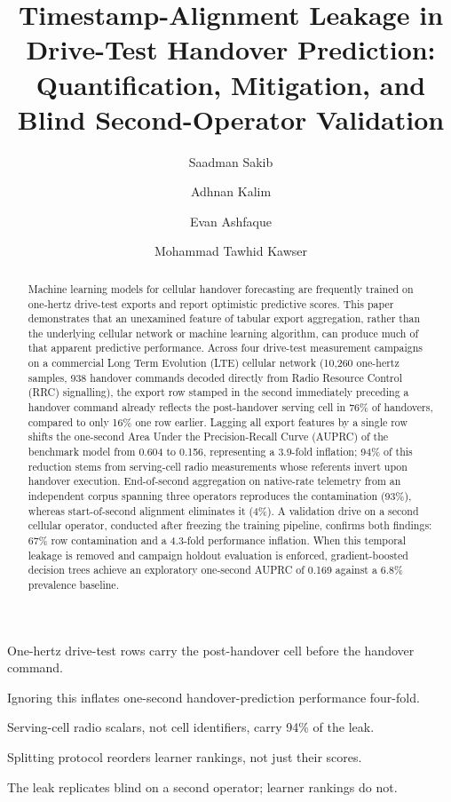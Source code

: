 \documentclass[5p,times,twocolumn]{elsarticle}
\begin{document}
\begin{frontmatter}

\title{Timestamp-Alignment Leakage in Drive-Test Handover Prediction: Quantification, Mitigation, and Blind Second-Operator Validation}

\author[iut]{Saadman Sakib}
\author[iut]{Adhnan Kalim}
\author[iut]{Evan Ashfaque}
\author[iut]{Mohammad Tawhid Kawser}

\begin{abstract}
Machine learning models for cellular handover forecasting are frequently trained on one-hertz drive-test exports and report optimistic predictive scores. This paper demonstrates that an unexamined feature of tabular export aggregation, rather than the underlying cellular network or machine learning algorithm, can produce much of that apparent predictive performance. Across four drive-test measurement campaigns on a commercial Long Term Evolution (LTE) cellular network (10,260 one-hertz samples, 938 handover commands decoded directly from Radio Resource Control (RRC) signalling), the export row stamped in the second immediately preceding a handover command already reflects the post-handover serving cell in 76\% of handovers, compared to only 16\% one row earlier. Lagging all export features by a single row shifts the one-second Area Under the Precision-Recall Curve (AUPRC) of the benchmark model from 0.604 to 0.156, representing a 3.9-fold inflation; 94\% of this reduction stems from serving-cell radio measurements whose referents invert upon handover execution. End-of-second aggregation on native-rate telemetry from an independent corpus spanning three operators reproduces the contamination (93\%), whereas start-of-second alignment eliminates it (4\%). A validation drive on a second cellular operator, conducted after freezing the training pipeline, confirms both findings: 67\% row contamination and a 4.3-fold performance inflation. When this temporal leakage is removed and campaign holdout evaluation is enforced, gradient-boosted decision trees achieve an exploratory one-second AUPRC of 0.169 against a 6.8\% prevalence baseline.
\end{abstract}

\begin{highlights}
\item One-hertz drive-test rows carry the post-handover cell before the handover command.
\item Ignoring this inflates one-second handover-prediction performance four-fold.
\item Serving-cell radio scalars, not cell identifiers, carry 94\% of the leak.
\item Splitting protocol reorders learner rankings, not just their scores.
\item The leak replicates blind on a second operator; learner rankings do not.
\end{highlights}


\end{frontmatter}
\end{document}
